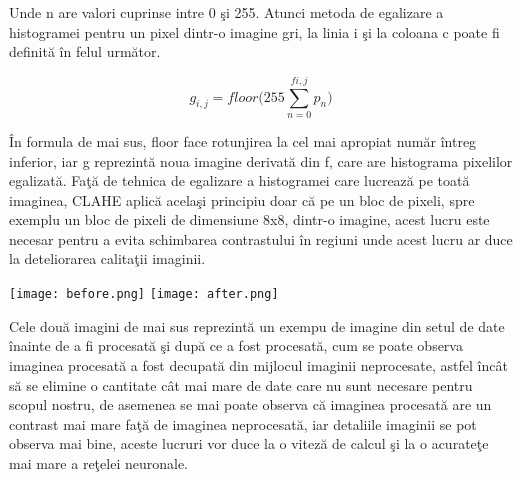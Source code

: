Unde n are valori cuprinse intre 0 \c{s}i 255. Atunci metoda de egalizare a histogramei pentru un pixel dintr-o imagine gri, la linia i \c{s}i la coloana c poate fi definit\u{a} \^{i}n felul urm\u{a}tor.

$$g_{i,j} = floor\bigg( 255 \sum_{n=0}^{f{i,j}} p_n \bigg)$$

\^{I}n formula de mai sus, floor face rotunjirea la cel mai apropiat num\u{a}r \^{i}ntreg inferior, iar g reprezint\u{a} noua imagine derivat\u{a} din f, care are histograma pixelilor egalizat\u{a}. Fa\c{t}\u{a} de tehnica de egalizare a histogramei care lucreaz\u{a} pe toat\u{a} imaginea, CLAHE aplic\u{a} acela\c{s}i principiu doar c\u{a} pe un bloc de pixeli, spre exemplu un bloc de pixeli de dimensiune 8x8, dintr-o imagine, acest lucru este necesar pentru a evita schimbarea contrastului \^{i}n regiuni unde acest lucru ar duce la deteliorarea calita\c{t}ii imaginii.

\begin{center}
\texttt{[image: before.png]}
\texttt{[image: after.png]}
\end{center}

Cele dou\u{a} imagini de mai sus reprezint\u{a} un exempu de imagine din setul de date \^{i}nainte de a fi procesat\u{a} \c{s}i dup\u{a} ce a fost procesat\u{a}, cum se poate observa imaginea procesat\u{a} a fost decupat\u{a} din mijlocul imaginii neprocesate, astfel \^{i}nc\^{a}t s\u{a} se elimine o cantitate c\^{a}t mai mare de date care nu sunt necesare pentru scopul nostru, de asemenea se mai poate observa c\u{a} imaginea procesat\u{a} are un contrast mai mare fa\c{t}\u{a} de imaginea neprocesat\u{a}, iar detaliile imaginii se pot observa mai bine, aceste lucruri vor duce la o vitez\u{a} de calcul \c{s}i la o acurate\c{t}e mai mare a re\c{t}elei neuronale.

\par

